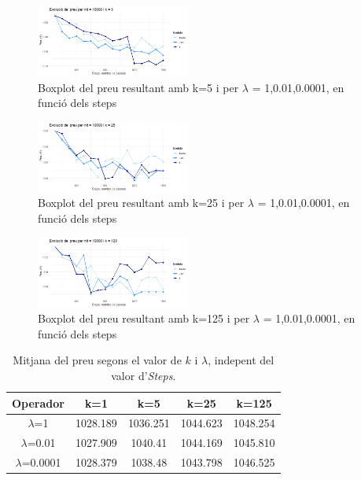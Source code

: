 \documentclass[a4paper]{article}
\begin{document}
	\begin{figure}[H]
		\centering
		\includegraphics[width=0.45\textwidth]{images/exp3_k5.png}
		\caption{Boxplot del preu resultant amb k=5 i per $\lambda$ = {1,0.01,0.0001}, en funció dels steps}
		\label{fig:exp3_k5}
	\end{figure}
	
	\begin{figure}[H]
		\centering
		\includegraphics[width=0.45\textwidth]{images/exp3_k25.png}
		\caption{Boxplot del preu resultant amb k=25 i per $\lambda$ = {1,0.01,0.0001}, en funció dels steps}
		\label{fig:exp3_k25}
	\end{figure}
	
	\begin{figure}[H]
		\centering
		\includegraphics[width=0.45\textwidth]{images/exp3_k125.png}
		\caption{Boxplot del preu resultant amb k=125 i per $\lambda$ = {1,0.01,0.0001}, en funció dels steps}
		\label{fig:exp3_k125}
	\end{figure}
	
	\begin{table}[H]
		\centering
		\begin{tabular}{|c|c|c|c|c|}
			\hline
			\textbf{Operador} & \textbf{k=1} & \textbf{k=5} & \textbf{k=25} & \textbf{k=125} \\
			\hline
			$\lambda$=1 & 1028.189 & 1036.251 & 1044.623 & 1048.254 \\
			\hline
			$\lambda$=0.01 & 1027.909 & 1040.41 & 1044.169 & 1045.810 \\
			\hline
			$\lambda$=0.0001 & 1028.379 & 1038.48 & 1043.798 & 1046.525 \\
			\hline
		\end{tabular}
		\caption{Mitjana del preu segons el valor de $k$ i $\lambda$, indepent del valor d'\textit{Steps}.}
		\label{tab:exp3_estadisticas}
	\end{table}
	
\end{document}
